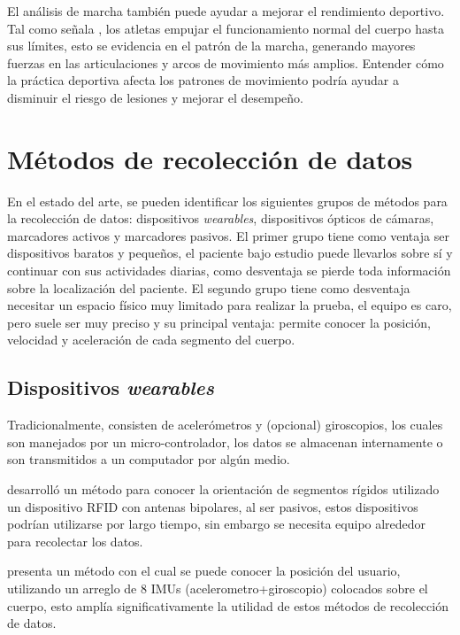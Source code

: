 El análisis de marcha también puede ayudar a mejorar el rendimiento deportivo. Tal como señala \cite{perry}, los atletas empujar el funcionamiento normal del cuerpo hasta sus límites, esto se evidencia en el patrón de la marcha, generando mayores fuerzas en las articulaciones y arcos de movimiento más amplios. Entender cómo la práctica deportiva afecta los patrones de movimiento podría ayudar a disminuir el riesgo de lesiones y mejorar el desempeño.  






\section[Métodos de recolección]{Métodos de recolección de datos}

En el estado del arte, se pueden identificar los siguientes grupos de métodos para la recolección de datos: dispositivos \emph{wearables}, dispositivos ópticos de cámaras, marcadores activos y marcadores pasivos. El primer grupo tiene como ventaja ser dispositivos baratos y pequeños, el paciente bajo estudio puede llevarlos sobre sí y continuar con sus actividades diarias, como desventaja se pierde toda información sobre la localización del paciente. El segundo grupo tiene como desventaja necesitar un espacio físico muy limitado para realizar la prueba, el equipo es caro, pero suele ser muy preciso y su principal ventaja: permite conocer la posición, velocidad y aceleración de cada segmento del cuerpo. 

\subsection{Dispositivos \emph{wearables}}

Tradicionalmente, consisten de acelerómetros y (opcional) giroscopios, los cuales son manejados por un micro-controlador, los datos se almacenan internamente o son transmitidos a un computador por algún medio.

\cite{krigslund} desarrolló un método para conocer la orientación de segmentos rígidos utilizado un dispositivo RFID con antenas bipolares, al ser pasivos, estos dispositivos podrían utilizarse por largo tiempo, sin embargo se necesita equipo alrededor para recolectar los datos. 

\cite{yuan} presenta un método con el cual se puede conocer la posición del usuario, utilizando un arreglo de 8 IMUs (acelerometro+giroscopio) colocados sobre el cuerpo, esto amplía significativamente la utilidad de estos métodos de recolección de datos. 


